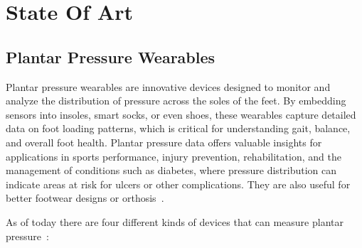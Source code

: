 
%

\chapter{State Of Art}
\label{cha:Soa}

\glsresetall


\newpage
\section{Plantar Pressure Wearables}
\label{sec:plantar_pressure_wearables}

Plantar pressure wearables are innovative devices designed to monitor and analyze the distribution of pressure across the soles of the feet. By embedding sensors into insoles, smart 
socks, or even shoes, these wearables capture detailed data on foot loading patterns, which is critical for understanding gait, balance, and overall foot health. Plantar pressure data 
offers valuable insights for applications in sports performance, injury prevention, rehabilitation, and the management of conditions such as diabetes, where pressure distribution can 
indicate areas at risk for ulcers or other complications. They are also useful for better footwear designs or orthosis~\cite{coimbra, embedding, devInsole, deepLearn}.


As of today there are four different kinds of devices that can measure plantar pressure~\cite{smartSocks}:

